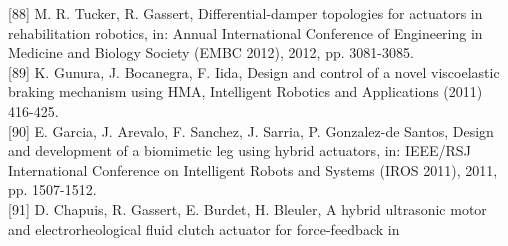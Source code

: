 \documentclass[10pt]{article}
\begin{document}
[88] M. R. Tucker, R. Gassert, Differential-damper topologies for actuators in rehabilitation robotics, in: Annual International Conference of Engineering in Medicine and Biology Society (EMBC 2012), 2012, pp. 3081-3085.\\[0pt]
[89] K. Gunura, J. Bocanegra, F. Iida, Design and control of a novel viscoelastic braking mechanism using HMA, Intelligent Robotics and Applications (2011) 416-425.\\[0pt]
[90] E. Garcia, J. Arevalo, F. Sanchez, J. Sarria, P. Gonzalez-de Santos, Design and development of a biomimetic leg using hybrid actuators, in: IEEE/RSJ International Conference on Intelligent Robots and Systems (IROS 2011), 2011, pp. 1507-1512.\\[0pt]
[91] D. Chapuis, R. Gassert, E. Burdet, H. Bleuler, A hybrid ultrasonic motor and electrorheological fluid clutch actuator for force-feedback in
\end{document}
